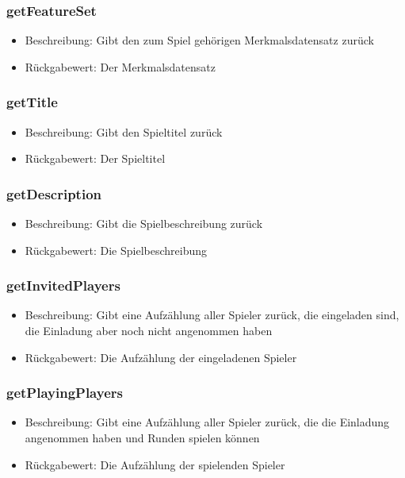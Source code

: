 \documentclass[a4paper]{scrreprt}
\begin{document}
   \subsubsection{getFeatureSet}
   \begin{itemize}
           \item Beschreibung: Gibt den zum Spiel gehörigen Merkmalsdatensatz zurück
           \item Rückgabewert: Der Merkmalsdatensatz
   \end{itemize}
   \subsubsection{getTitle}
   \begin{itemize}
           \item Beschreibung: Gibt den Spieltitel zurück
           \item Rückgabewert: Der Spieltitel
   \end{itemize}
   \subsubsection{getDescription}
      \begin{itemize}
              \item Beschreibung: Gibt die Spielbeschreibung zurück
              \item Rückgabewert: Die Spielbeschreibung
      \end{itemize}
   \subsubsection{getInvitedPlayers}
      \begin{itemize}
              \item Beschreibung: Gibt eine Aufzählung aller Spieler zurück, die eingeladen sind, die Einladung aber noch nicht angenommen haben
              \item Rückgabewert: Die Aufzählung der eingeladenen Spieler
      \end{itemize}
   \subsubsection{getPlayingPlayers}
      \begin{itemize}
              \item Beschreibung: Gibt eine Aufzählung aller Spieler zurück, die die Einladung angenommen haben und Runden spielen können
              \item Rückgabewert: Die Aufzählung der spielenden Spieler
      \end{itemize}
\end{document}
